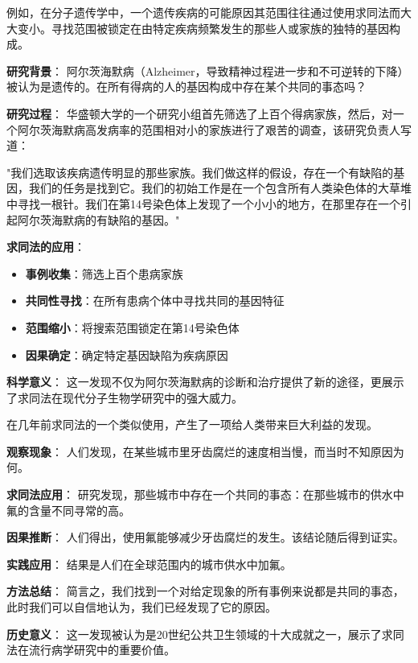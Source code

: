\begin{examplebox}[title=分子遗传学中的求同法应用：阿尔茨海默病研究]
例如，在分子遗传学中，一个遗传疾病的可能原因其范围往往通过使用求同法而大大变小。寻找范围被锁定在由特定疾病频繁发生的那些人或家族的独特的基因构成。

\textbf{研究背景}：
阿尔茨海默病（Alzheimer，导致精神过程进一步和不可逆转的下降）被认为是遗传的。在所有得病的人的基因构成中存在某个共同的事态吗？

\textbf{研究过程}：
华盛顿大学的一个研究小组首先筛选了上百个得病家族，然后，对一个阿尔茨海默病高发病率的范围相对小的家族进行了艰苦的调查，该研究负责人写道：

"我们选取该疾病遗传明显的那些家族。我们做这样的假设，存在一个有缺陷的基因，我们的任务是找到它。我们的初始工作是在一个包含所有人类染色体的大草堆中寻找一根针。我们在第14号染色体上发现了一个小小的地方，在那里存在一个引起阿尔茨海默病的有缺陷的基因。"\cite{tanzi1996}

\textbf{求同法的应用}：
\begin{itemize}
\item \textbf{事例收集}：筛选上百个患病家族
\item \textbf{共同性寻找}：在所有患病个体中寻找共同的基因特征
\item \textbf{范围缩小}：将搜索范围锁定在第14号染色体
\item \textbf{因果确定}：确定特定基因缺陷为疾病原因
\end{itemize}

\textbf{科学意义}：
这一发现不仅为阿尔茨海默病的诊断和治疗提供了新的途径，更展示了求同法在现代分子生物学研究中的强大威力。
\end{examplebox}

\begin{examplebox}[title=公共卫生史上的重大发现：氟化物防龋]
在几年前求同法的一个类似使用，产生了一项给人类带来巨大利益的发现。

\textbf{观察现象}：
人们发现，在某些城市里牙齿腐烂的速度相当慢，而当时不知原因为何。

\textbf{求同法应用}：
研究发现，那些城市中存在一个共同的事态：在那些城市的供水中氟的含量不同寻常的高。

\textbf{因果推断}：
人们得出，使用氟能够减少牙齿腐烂的发生。该结论随后得到证实。

\textbf{实践应用}：
结果是人们在全球范围内的城市供水中加氟。

\textbf{方法总结}：
简言之，我们找到一个对给定现象的所有事例来说都是共同的事态，此时我们可以自信地认为，我们已经发现了它的原因。

\textbf{历史意义}：
这一发现被认为是20世纪公共卫生领域的十大成就之一，展示了求同法在流行病学研究中的重要价值。
\end{examplebox}

